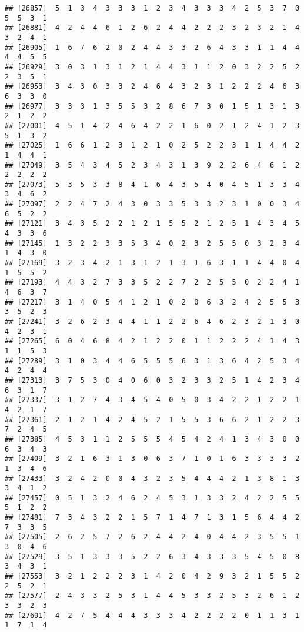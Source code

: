 \documentclass[
]{article}
\begin{document}
\begin{verbatim}
## [26857]  5  1  3  4  3  3  3  1  2  3  4  3  3  3  4  2  5  3  7  0  5  5  3  1
## [26881]  4  2  4  4  6  1  2  6  2  4  4  2  2  2  3  2  3  2  1  4  3  2  4  1
## [26905]  1  6  7  6  2  0  2  4  4  3  3  2  6  4  3  3  1  1  4  4  4  4  5  5
## [26929]  3  0  3  1  3  1  2  1  4  4  3  1  1  2  0  3  2  2  5  2  2  3  5  1
## [26953]  3  4  3  0  3  3  2  4  6  4  3  2  3  1  2  2  2  4  6  3  6  3  3  0
## [26977]  3  3  3  1  3  5  5  3  2  8  6  7  3  0  1  5  1  3  1  3  2  1  2  2
## [27001]  4  5  1  4  2  4  6  4  2  2  1  6  0  2  1  2  4  1  2  3  5  1  3  2
## [27025]  1  6  6  1  2  3  1  2  1  0  2  5  2  2  3  1  1  4  4  2  1  4  4  1
## [27049]  3  5  4  3  4  5  2  3  4  3  1  3  9  2  2  6  4  6  1  2  2  2  2  2
## [27073]  5  3  5  3  3  8  4  1  6  4  3  5  4  0  4  5  1  3  3  4  3  4  6  2
## [27097]  2  2  4  7  2  4  3  0  3  3  5  3  3  2  3  1  0  0  3  4  6  5  2  2
## [27121]  3  4  3  5  2  2  1  2  1  5  5  2  1  2  5  1  4  3  4  5  4  3  3  6
## [27145]  1  3  2  2  3  3  5  3  4  0  2  3  2  5  5  0  3  2  3  4  1  4  3  0
## [27169]  3  2  3  4  2  1  3  1  2  1  3  1  6  3  1  1  4  4  0  4  1  5  5  2
## [27193]  4  4  3  2  7  3  3  5  2  2  7  2  2  5  5  0  2  2  4  1  4  6  3  7
## [27217]  3  1  4  0  5  4  1  2  1  0  2  0  6  3  2  4  2  5  5  3  3  5  2  3
## [27241]  3  2  6  2  3  4  4  1  1  2  2  6  4  6  2  3  2  1  3  0  4  2  3  1
## [27265]  6  0  4  6  8  4  2  1  2  2  0  1  1  2  2  2  4  1  4  3  1  1  5  3
## [27289]  3  1  0  3  4  4  6  5  5  5  6  3  1  3  6  4  2  5  3  4  4  2  4  4
## [27313]  3  7  5  3  0  4  0  6  0  3  2  3  3  2  5  1  4  2  3  4  6  3  1  7
## [27337]  3  1  2  7  4  3  4  5  4  0  5  0  3  4  2  2  1  2  2  1  4  2  1  7
## [27361]  2  1  2  1  4  2  4  5  2  1  5  5  3  6  6  2  1  2  2  3  7  2  4  5
## [27385]  4  5  3  1  1  2  5  5  5  4  5  4  2  4  1  3  4  3  0  0  6  3  4  3
## [27409]  3  2  1  6  3  1  3  0  6  3  7  1  0  1  6  3  3  3  3  2  1  3  4  6
## [27433]  3  2  4  2  0  0  4  3  2  3  5  4  4  4  2  1  3  8  1  3  3  4  1  2
## [27457]  0  5  1  3  2  4  6  2  4  5  3  1  3  3  2  4  2  2  5  5  5  1  2  2
## [27481]  7  3  4  3  2  2  1  5  7  1  4  7  1  3  1  5  6  4  4  2  7  3  3  5
## [27505]  2  6  2  5  7  2  6  2  4  4  2  4  0  4  4  2  3  5  5  1  3  0  4  6
## [27529]  3  5  1  3  3  3  5  2  2  6  3  4  3  3  3  5  4  5  0  8  3  4  3  1
## [27553]  3  2  1  2  2  2  3  1  4  2  0  4  2  9  3  2  1  5  5  2  2  5  2  1
## [27577]  2  4  3  3  2  5  3  1  4  4  5  3  3  2  5  3  2  6  1  2  3  3  2  3
## [27601]  4  2  7  5  4  4  4  3  3  3  4  2  2  2  2  0  1  1  3  1  1  7  1  4

\end{verbatim}
\end{document}
